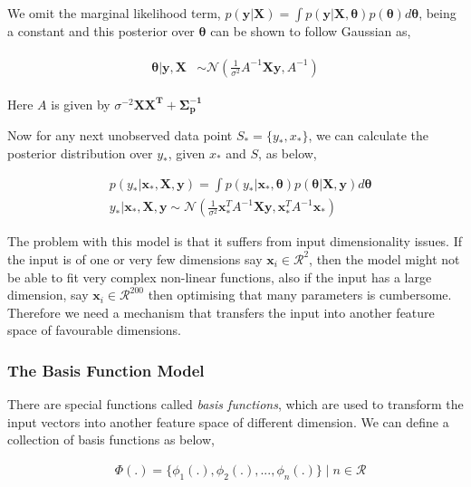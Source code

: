 \documentclass[english]{tktltiki}
\begin{document}
We omit the marginal likelihood term, $p(\mathbf{y} | \mathbf{X}) = \int p(\mathbf{y} | \mathbf{X}, \boldsymbol \theta)p(\boldsymbol \theta)d\boldsymbol \theta$, being a constant and this posterior over $\boldsymbol \theta$ can be shown to follow Gaussian as,

\begin{eqnarray}
\begin{split}
\boldsymbol \theta | \mathbf{y}, \mathbf{X} & \sim \mathcal{N}(\frac{1}{\sigma^2} A^{-1} \mathbf{Xy}, A^{-1})
\end{split}
\end{eqnarray}

Here $A$ is given by $\sigma^{-2} \mathbf{XX^T + \Sigma_p^{-1}}$

Now for any next unobserved data point $S_* = \{y_*, x_*\}$, we can calculate the posterior distribution over $y_*$, given $x_*$ and $S$, as below,

\begin{equation}
\label{conti_rnd_var_bayes_poster}
\begin{split}
	&p(y_* | \mathbf{x}_*, \mathbf{X}, \mathbf{y}) = \int p(y_* | \mathbf{x}_*, \boldsymbol\theta)p(\boldsymbol\theta | \mathbf{X}, \mathbf{y})d \boldsymbol\theta \\
	&y_* | \mathbf{x}_*, \mathbf{X}, \mathbf{y} \sim \mathcal{N}(\frac{1}{\sigma^2}\mathbf{x}_*^T A^{-1} \mathbf{Xy}, \mathbf{x}_*^T A^{-1} \mathbf{x}_*)
\end{split}
\end{equation}

The problem with this model is that it suffers from input dimensionality issues. If the input is of one or very few dimensions say $\mathbf{x}_i \in \mathcal{R}^2$, then the model might not be able to fit very complex non-linear functions, also if the input has a large dimension, say $\mathbf{x}_i \in \mathcal{R}^{200}$ then optimising that many parameters is cumbersome. Therefore we need a mechanism that transfers the input into another feature space of favourable dimensions.


\subsubsection{The Basis Function Model}
There are special functions called \textit{basis functions}, which are used to transform the input vectors into another feature space of different dimension. We can define a collection of basis functions as below,

\begin{equation}
\label{eqn:basis_function}
\begin{split}
	&\Phi(.) = \{\phi_1(.), \phi_2(.), ...,\phi_n(.)\} \mid n \in \mathcal{R}
\end{split}
\end{equation}
\end{document}
